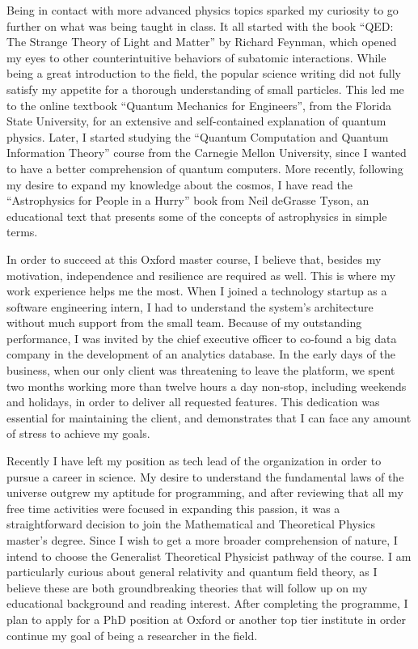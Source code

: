 \documentclass[11pt]{article}
\newcommand*{\NEWLINE}{\vspace{0.75em}}
\begin{document}
Being in contact with more advanced physics topics sparked my curiosity to go further on what was being taught in class. It all started with the book ``QED: The Strange Theory of Light and Matter'' by Richard Feynman, which opened my eyes to other counterintuitive behaviors of subatomic interactions. While being a great introduction to the field, the popular science writing did not fully satisfy my appetite for a thorough understanding of small particles. This led me to the online textbook ``Quantum Mechanics for Engineers'', from the Florida State University, for an extensive and self-contained explanation of quantum physics. Later, I started studying the ``Quantum Computation and Quantum Information Theory'' course from the Carnegie Mellon University, since I wanted to have a better comprehension of quantum computers. More recently, following my desire to expand my knowledge about the cosmos, I have read the ``Astrophysics for People in a Hurry'' book from Neil deGrasse Tyson, an educational text that presents some of the concepts of astrophysics in simple terms.
\NEWLINE{}

In order to succeed at this Oxford master course, I believe that, besides my motivation, independence and resilience are required as well. This is where my work experience helps me the most. When I joined a technology startup as a software engineering intern, I had to understand the system's architecture without much support from the small team. Because of my outstanding performance, I was invited by the chief executive officer to co-found a big data company in the development of an analytics database. In the early days of the business, when our only client was threatening to leave the platform, we spent two months working more than twelve hours a day non-stop, including weekends and holidays, in order to deliver all requested features. This dedication was essential for maintaining the client, and demonstrates that I can face any amount of stress to achieve my goals. \NEWLINE{}

Recently I have left my position as tech lead of the organization in order to pursue a career in science. My desire to understand the fundamental laws of the universe outgrew my aptitude for programming, and after reviewing that all my free time activities were focused in expanding this passion, it was a straightforward decision to join the Mathematical and Theoretical Physics master's degree. Since I wish to get a more broader comprehension of nature, I intend to choose the Generalist Theoretical Physicist pathway of the course. I am particularly curious about general relativity and quantum field theory, as I believe these are both groundbreaking theories that will follow up on my educational background and reading interest. After completing the programme, I plan to apply for a PhD position at Oxford or another top tier institute in order continue my goal of being a researcher in the field.    
\end{document}
